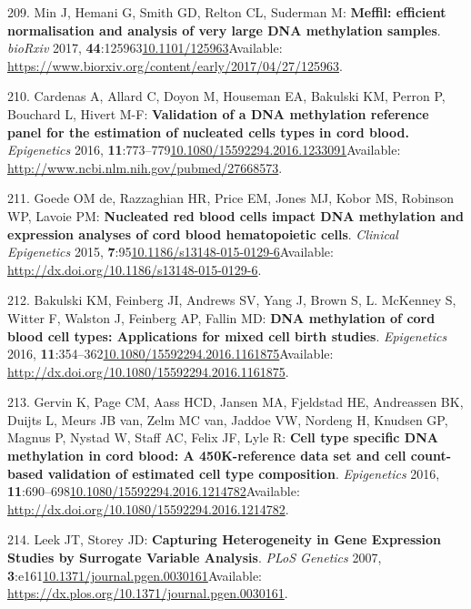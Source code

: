 \documentclass[
]{book}
\begin{document}
\leavevmode\hypertarget{ref-Min2017}{}%
209. Min J, Hemani G, Smith GD, Relton CL, Suderman M: \textbf{Meffil: efficient normalisation and analysis of very large DNA methylation samples}. \emph{bioRxiv} 2017, \textbf{44}:125963\href{https://doi.org/10.1101/125963}{10.1101/125963}Available: \url{https://www.biorxiv.org/content/early/2017/04/27/125963}.

\leavevmode\hypertarget{ref-Cardenas2016}{}%
210. Cardenas A, Allard C, Doyon M, Houseman EA, Bakulski KM, Perron P, Bouchard L, Hivert M-F: \textbf{Validation of a DNA methylation reference panel for the estimation of nucleated cells types in cord blood.} \emph{Epigenetics} 2016, \textbf{11}:773--779\href{https://doi.org/10.1080/15592294.2016.1233091}{10.1080/15592294.2016.1233091}Available: \url{http://www.ncbi.nlm.nih.gov/pubmed/27668573}.

\leavevmode\hypertarget{ref-DeGoede2015}{}%
211. Goede OM de, Razzaghian HR, Price EM, Jones MJ, Kobor MS, Robinson WP, Lavoie PM: \textbf{Nucleated red blood cells impact DNA methylation and expression analyses of cord blood hematopoietic cells}. \emph{Clinical Epigenetics} 2015, \textbf{7}:95\href{https://doi.org/10.1186/s13148-015-0129-6}{10.1186/s13148-015-0129-6}Available: \url{http://dx.doi.org/10.1186/s13148-015-0129-6}.

\leavevmode\hypertarget{ref-Bakulski2016}{}%
212. Bakulski KM, Feinberg JI, Andrews SV, Yang J, Brown S, L. McKenney S, Witter F, Walston J, Feinberg AP, Fallin MD: \textbf{DNA methylation of cord blood cell types: Applications for mixed cell birth studies}. \emph{Epigenetics} 2016, \textbf{11}:354--362\href{https://doi.org/10.1080/15592294.2016.1161875}{10.1080/15592294.2016.1161875}Available: \url{http://dx.doi.org/10.1080/15592294.2016.1161875}.

\leavevmode\hypertarget{ref-Gervin2016}{}%
213. Gervin K, Page CM, Aass HCD, Jansen MA, Fjeldstad HE, Andreassen BK, Duijts L, Meurs JB van, Zelm MC van, Jaddoe VW, Nordeng H, Knudsen GP, Magnus P, Nystad W, Staff AC, Felix JF, Lyle R: \textbf{Cell type specific DNA methylation in cord blood: A 450K-reference data set and cell count-based validation of estimated cell type composition}. \emph{Epigenetics} 2016, \textbf{11}:690--698\href{https://doi.org/10.1080/15592294.2016.1214782}{10.1080/15592294.2016.1214782}Available: \url{http://dx.doi.org/10.1080/15592294.2016.1214782}.

\leavevmode\hypertarget{ref-Leek2007}{}%
214. Leek JT, Storey JD: \textbf{Capturing Heterogeneity in Gene Expression Studies by Surrogate Variable Analysis}. \emph{PLoS Genetics} 2007, \textbf{3}:e161\href{https://doi.org/10.1371/journal.pgen.0030161}{10.1371/journal.pgen.0030161}Available: \url{https://dx.plos.org/10.1371/journal.pgen.0030161}.
\end{document}
